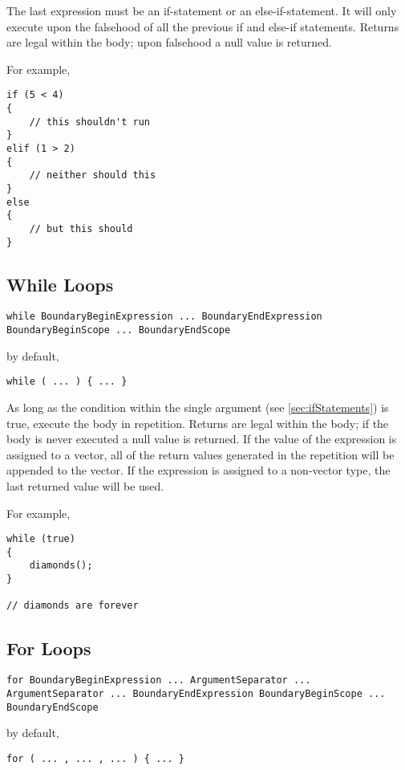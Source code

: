 \documentclass[10pt,a4paper]{article}
\begin{document}
The last expression must be an if-statement or an else-if-statement. It will only execute upon the falsehood of all the previous if and else-if statements. Returns are legal within the body; upon falsehood a null value is returned.

For example,
\begin{verbatim}
if (5 < 4)
{
    // this shouldn't run
}
elif (1 > 2)
{
    // neither should this
}
else
{
    // but this should
}
\end{verbatim}

\subsection{While Loops}
\label{sec:whileLoops}
\begin{verbatim}
while BoundaryBeginExpression ... BoundaryEndExpression BoundaryBeginScope ... BoundaryEndScope
\end{verbatim}

by default,
\begin{verbatim}
while ( ... ) { ... }
\end{verbatim}

As long as the condition within the single argument (see \ref{sec:ifStatements}) is true, execute the body in repetition. Returns are legal within the body; if the body is never executed a null value is returned. If the value of the expression is assigned to a vector, all of the return values generated in the repetition will be appended to the vector. If the expression is assigned to a non-vector type, the last returned value will be used.

For example,
\begin{verbatim}
while (true)
{
    diamonds();
}

// diamonds are forever
\end{verbatim}

\subsection{For Loops}
\begin{verbatim}
for BoundaryBeginExpression ... ArgumentSeparator ... ArgumentSeparator ... BoundaryEndExpression BoundaryBeginScope ... BoundaryEndScope
\end{verbatim}

by default,
\begin{verbatim}
for ( ... , ... , ... ) { ... }
\end{verbatim}
\end{document}
